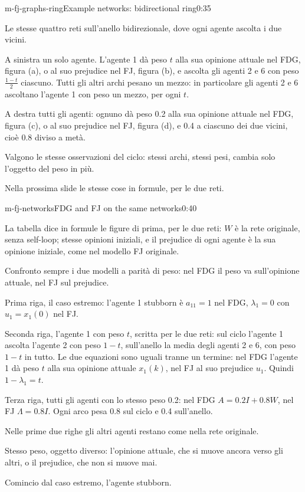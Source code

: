 \begin{slide}{m-fj-graphs-ring}{Example networks: bidirectional ring}{0:35}
  \begin{discorso}
    \item Le stesse quattro reti sull'anello bidirezionale, dove ogni agente ascolta i due vicini.
    \item A sinistra un solo agente. L'agente 1 dà peso $t$ alla sua opinione attuale nel FDG, figura (a), o al suo prejudice nel FJ, figura (b), e ascolta gli agenti 2 e 6 con peso $\frac{1-t}{2}$ ciascuno. Tutti gli altri archi pesano un mezzo: in particolare gli agenti 2 e 6 ascoltano l'agente 1 con peso un mezzo, per ogni $t$.
    \item A destra tutti gli agenti: ognuno dà peso 0.2 alla sua opinione attuale nel FDG, figura (c), o al suo prejudice nel FJ, figura (d), e 0.4 a ciascuno dei due vicini, cioè 0.8 diviso a metà.
    \item Valgono le stesse osservazioni del ciclo: stessi archi, stessi pesi, cambia solo l'oggetto del peso in più.
    \item Nella prossima slide le stesse cose in formule, per le due reti.
  \end{discorso}
\end{slide}

\begin{slide}{m-fj-networks}{FDG and FJ on the same networks}{0:40}
  \begin{discorso}
    \item La tabella dice in formule le figure di prima, per le due reti: $W$ è la rete originale, senza self-loop; stesse opinioni iniziali, e il prejudice di ogni agente è la sua opinione iniziale, come nel modello FJ originale.
    \item Confronto sempre i due modelli a parità di peso: nel FDG il peso va sull'opinione attuale, nel FJ sul prejudice.
    \item Prima riga, il caso estremo: l'agente 1 stubborn è $a_{11}=1$ nel FDG, $\lambda_1=0$ con $u_1=x_1(0)$ nel FJ.
    \item Seconda riga, l'agente 1 con peso $t$, scritta per le due reti: sul ciclo l'agente 1 ascolta l'agente 2 con peso $1-t$, sull'anello la media degli agenti 2 e 6, con peso $1-t$ in tutto. Le due equazioni sono uguali tranne un termine: nel FDG l'agente 1 dà peso $t$ alla sua opinione attuale $x_1(k)$, nel FJ al suo prejudice $u_1$. Quindi $1-\lambda_1=t$.
    \item Terza riga, tutti gli agenti con lo stesso peso 0.2: nel FDG $A=0.2I+0.8W$, nel FJ $\Lambda=0.8I$. Ogni arco pesa 0.8 sul ciclo e 0.4 sull'anello.
    \item Nelle prime due righe gli altri agenti restano come nella rete originale.
    \item Stesso peso, oggetto diverso: l'opinione attuale, che si muove ancora verso gli altri, o il prejudice, che non si muove mai.
    \item Comincio dal caso estremo, l'agente stubborn.
  \end{discorso}
\end{slide}

